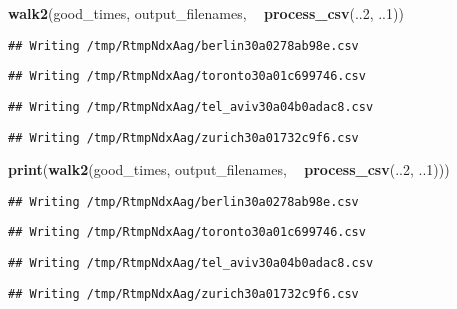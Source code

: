 \documentclass[]{book}
\newenvironment{Shaded}{\begin{snugshade}}{\end{snugshade}}
\newcommand{\DecValTok}[1]{\textcolor[rgb]{0.00,0.00,0.81}{#1}}
\newcommand{\KeywordTok}[1]{\textcolor[rgb]{0.13,0.29,0.53}{\textbf{#1}}}
\newcommand{\NormalTok}[1]{#1}
\newcommand{\OperatorTok}[1]{\textcolor[rgb]{0.81,0.36,0.00}{\textbf{#1}}}
\newcommand{\StringTok}[1]{\textcolor[rgb]{0.31,0.60,0.02}{#1}}
\begin{document}
\begin{Shaded}
\begin{Highlighting}[]
\KeywordTok{walk2}\NormalTok{(good_times, output_filenames, }\OperatorTok{~}\StringTok{ }\KeywordTok{process_csv}\NormalTok{(..}\DecValTok{2}\NormalTok{, ..}\DecValTok{1}\NormalTok{))}
\end{Highlighting}
\end{Shaded}

\begin{verbatim}
## Writing /tmp/RtmpNdxAag/berlin30a0278ab98e.csv
\end{verbatim}

\begin{verbatim}
## Writing /tmp/RtmpNdxAag/toronto30a01c699746.csv
\end{verbatim}

\begin{verbatim}
## Writing /tmp/RtmpNdxAag/tel_aviv30a04b0adac8.csv
\end{verbatim}

\begin{verbatim}
## Writing /tmp/RtmpNdxAag/zurich30a01732c9f6.csv
\end{verbatim}

\begin{Shaded}
\begin{Highlighting}[]
\KeywordTok{print}\NormalTok{(}\KeywordTok{walk2}\NormalTok{(good_times, output_filenames, }\OperatorTok{~}\StringTok{ }\KeywordTok{process_csv}\NormalTok{(..}\DecValTok{2}\NormalTok{, ..}\DecValTok{1}\NormalTok{)))}
\end{Highlighting}
\end{Shaded}

\begin{verbatim}
## Writing /tmp/RtmpNdxAag/berlin30a0278ab98e.csv
\end{verbatim}

\begin{verbatim}
## Writing /tmp/RtmpNdxAag/toronto30a01c699746.csv
\end{verbatim}

\begin{verbatim}
## Writing /tmp/RtmpNdxAag/tel_aviv30a04b0adac8.csv
\end{verbatim}

\begin{verbatim}
## Writing /tmp/RtmpNdxAag/zurich30a01732c9f6.csv
\end{verbatim}
\end{document}
